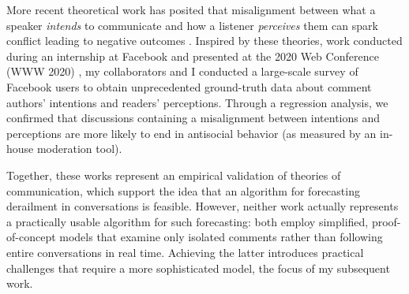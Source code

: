 \documentclass[11pt,letterpaper]{article}
\begin{document}
More recent theoretical work has posited that misalignment between what a speaker \emph{intends} to communicate and how a listener \emph{perceives} them can spark conflict leading to negative outcomes \cite{tannen_indirectness_2000}.
Inspired by these theories, work conducted during an internship at Facebook and presented at the 2020 Web Conference (WWW 2020) \cite{chang_dont_2020}, my collaborators and I conducted a large-scale survey of Facebook users to obtain unprecedented ground-truth data about comment authors' intentions and readers' perceptions.
Through a regression analysis, we confirmed that discussions containing a misalignment between intentions and perceptions are more likely to end in antisocial behavior (as measured by an in-house moderation tool).

Together, these works represent an empirical validation of theories of communication, which support the idea that an algorithm for forecasting derailment in conversations is feasible.
However, neither work actually represents a practically usable algorithm for such forecasting: both employ simplified, proof-of-concept models that examine only isolated comments rather than following entire conversations in real time.
Achieving the latter introduces practical challenges that require a more sophisticated model, the focus of my subsequent work.

\vspace{\baselineskip}


\end{document}
